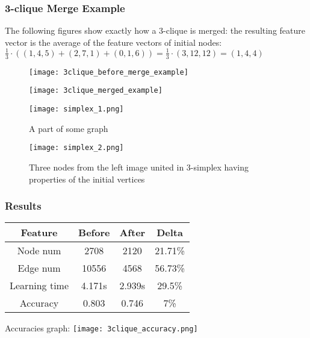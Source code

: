 \begin{frame}[allowframebreaks]
	\frametitle{3-clique Merge Example}

	The following figures show exactly how a 3-clique is merged: the resulting feature vector is the average of the feature vectors of initial nodes: $\frac{1}{3} \cdot \left( (1, 4, 5) + (2, 7, 1) + (0, 1, 6) \right) = \frac{1}{3} \cdot (3, 12, 12) = (1, 4, 4)$

	\begin{figure}[h]
		\begin{minipage}{.7\textwidth}
			\centering
			\texttt{[image: 3clique\_before\_merge\_example]}
		\end{minipage}%
		\begin{minipage}{.3\textwidth}
			\centering
			\texttt{[image: 3clique\_merged\_example]}
		\end{minipage}
	\end{figure}

	\framebreak

	\begin{figure}[h]
		\begin{multicols}{2}
			\centering
			\texttt{[image: simplex\_1.png]}
			\caption{A part of some graph}\label{fig:clique_merged}

			\centering
			\texttt{[image: simplex\_2.png]}
			\caption{Three nodes from the left image united in 3-simplex having properties of the initial vertices}
		\end{multicols}
	\end{figure}
\end{frame}

\begin{frame}[allowframebreaks, c]
	\frametitle{Results}

	\centering
	\begin{tabular}{ |c|c|c|c| }
		\hline
		Feature       & Before & After  & Delta   \\
		\hline
		Node num      & 2708   & 2120   & 21.71\% \\
		Edge num      & 10556  & 4568   & 56.73\% \\
		Learning time & 4.171s & 2.939s & 29.5\%  \\
		Accuracy      & 0.803  & 0.746  & 7\%     \\
		\hline
	\end{tabular}

	\framebreak

	Accuracies graph:
	\texttt{[image: 3clique\_accuracy.png]}
\end{frame}

